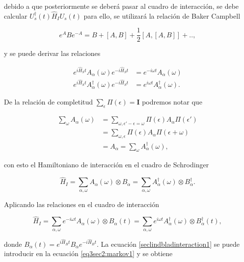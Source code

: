 debido a que posteriormente se deberá pasar al cuadro de interacción, se debe calcular $U^{\dagger}_{s}(t)\hat{H}_{I}U_{s}(t)$ para ello, se utilizará la relación de Baker Campbell

\begin{equation}
    e^{A}Be^{-A} = B  + [A,B] + \frac{1}{2}[A,[A,B]] +..,
    \label{sec2lind:baker}
\end{equation}

y se puede derivar las relaciones 

\begin{align*}
    e^{i\hat{H}_{S}t}A_{\alpha}(\omega) e^{-i\hat{H}_{S}t} & = e^{-i\omega t} A_{\alpha}(\omega) \\
    e^{i\hat{H}_{S}t}A^{\dagger}_{\alpha}(\omega) e^{-i\hat{H}_{S}t} & = e^{i\omega t} A^{\dagger}_{\alpha}(\omega).
\end{align*}

De la relación de completitud $\sum_{\epsilon}\Pi(\epsilon) = \mathbf{I}$ podremos notar que

\begin{align*}
   \sum_{\omega}A_{\alpha}(\omega) & =  \sum_{\omega,\epsilon'-\epsilon  = \omega} \Pi(\epsilon) A_{\alpha} \Pi(\epsilon') \\
   & = \sum_{\omega,\epsilon} \Pi(\epsilon) A_{\alpha} \Pi(\epsilon + \omega) \\
   & = A_{\alpha} = \sum_{\omega}A^{\dagger}_{\alpha}(\omega),
\end{align*}

con esto el Hamiltoniano de interacción en el cuadro de Schrodinger

\begin{equation*}
    \hat{H}_{I} = \sum_{\alpha,\omega}A_{\alpha}(\omega) \otimes B_{\alpha} = \sum_{\alpha,\omega}A^{\dagger}_{\alpha}(\omega) \otimes B^{\dagger}_{\alpha}.
\end{equation*}

Aplicando las relaciones en el cuadro de interacción

\begin{equation}
    \hat{H}_{I} = \sum_{\alpha,\omega}e^{-i\omega t}A_{\alpha}(\omega) \otimes B_{\alpha}(t) = \sum_{\alpha,\omega}e^{i\omega t}A^{\dagger}_{\alpha}(\omega) \otimes B^{\dagger}_{\alpha}(t),
    \label{seclindbladinteraction1}
\end{equation}

donde $B_{\alpha}(t) = e^{i\hat{H}_{B}t}B_{\alpha}e^{-i\hat{H}_{B}t}$. La ecuación \ref{seclindbladinteraction1} se puede introducir en la ecuación \ref{eq3sec2:markov1} y se obtiene 

